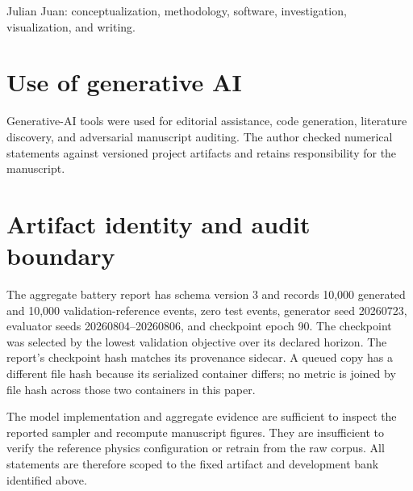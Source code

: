 \documentclass[11pt]{article}
\begin{document}
Julian Juan: conceptualization, methodology, software, investigation, visualization, and writing.

\section*{Use of generative AI}

Generative-AI tools were used for editorial assistance, code generation, literature discovery, and adversarial manuscript auditing. The author checked numerical statements against versioned project artifacts and retains responsibility for the manuscript.

\appendix
\section{Artifact identity and audit boundary}

The aggregate battery report has schema version 3 and records 10,000 generated and 10,000 validation-reference events, zero test events, generator seed 20260723, evaluator seeds 20260804--20260806, and checkpoint epoch 90. The checkpoint was selected by the lowest validation objective over its declared horizon. The report's checkpoint hash matches its provenance sidecar. A queued copy has a different file hash because its serialized container differs; no metric is joined by file hash across those two containers in this paper.

The model implementation and aggregate evidence are sufficient to inspect the reported sampler and recompute manuscript figures. They are insufficient to verify the reference physics configuration or retrain from the raw corpus. All statements are therefore scoped to the fixed artifact and development bank identified above.

\printbibliography
\end{document}
